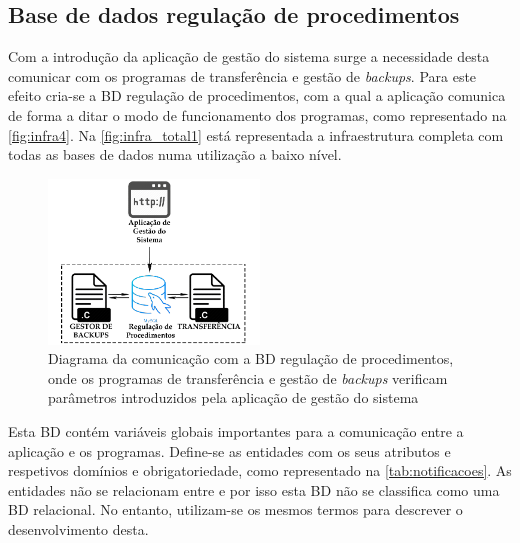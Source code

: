 \documentclass[11pt,twoside,a4paper]{report}
\begin{document}
\subsection{Base de dados regulação de procedimentos}
\label{subchap:notificacoes}
Com a introdução da aplicação de gestão do sistema surge a necessidade desta comunicar com os programas de transferência e gestão de \textit{backups}. Para este efeito cria-se a BD regulação de procedimentos, com a qual a aplicação comunica de forma a ditar o modo de funcionamento dos programas, como representado na \autoref{fig:infra4}. Na \autoref{fig:infra_total1} está representada a infraestrutura completa com todas as bases de dados numa utilização a baixo nível.
\begin{figure}[H]
	\centering
	\begin{center}
		\includegraphics[width=0.5\textwidth]{Aplicacao_notificacoes} %
		\caption[Diagrama da comunicação com a base de dados regulação de procedimentos]{Diagrama da comunicação com a BD regulação de procedimentos, onde os programas de transferência e gestão de \textit{backups} verificam parâmetros introduzidos pela aplicação de gestão do sistema}
		\label{fig:infra4}
	\end{center}
\end{figure}
Esta BD contém variáveis globais importantes para a comunicação entre a aplicação e os programas. Define-se as entidades com os seus atributos e respetivos domínios e obrigatoriedade, como representado na \autoref{tab:notificacoes}. As entidades não se relacionam entre e por isso esta BD não se classifica como uma BD relacional. No entanto, utilizam-se os mesmos termos para descrever o desenvolvimento desta.
\end{document}
